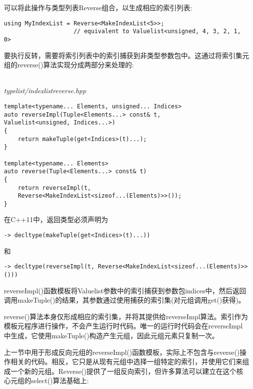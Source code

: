 可以将此操作与类型列表Reverse组合，以生成相应的索引列表:

\begin{lstlisting}[style=styleCXX]
using MyIndexList = Reverse<MakeIndexList<5>>;
					// equivalent to Valuelist<unsigned, 4, 3, 2, 1, 0>
\end{lstlisting}

要执行反转，需要将索引列表中的索引捕获到非类型参数包中。这通过将索引集元组的reverse()算法实现分成两部分来处理的:

\hspace*{\fill} \\ %
\noindent
\textit{typelist/indexlistreverse.hpp}
\begin{lstlisting}[style=styleCXX]
template<typename... Elements, unsigned... Indices>
auto reverseImpl(Tuple<Elements...> const& t,
Valuelist<unsigned, Indices...>)
{
	return makeTuple(get<Indices>(t)...);
}

template<typename... Elements>
auto reverse(Tuple<Elements...> const& t)
{
	return reverseImpl(t,
	Reverse<MakeIndexList<sizeof...(Elements)>>());
}
\end{lstlisting}

在C++11中，返回类型必须声明为

\begin{lstlisting}[style=styleCXX]
-> decltype(makeTuple(get<Indices>(t)...))
\end{lstlisting}

和

\begin{lstlisting}[style=styleCXX]
-> decltype(reverseImpl(t, Reverse<MakeIndexList<sizeof...(Elements)>>()))
\end{lstlisting}

reverseImpl()函数模板将Valuelist参数中的索引捕获到参数包indices中，然后返回调用makeTuple()的结果，其参数通过使用捕获的索引集(对元组调用get()获得)。

reverse()算法本身仅形成相应的索引集，并将其提供给reverseImpl算法。索引作为模板元程序进行操作，不会产生运行时代码。唯一的运行时代码会在reverseImpl中生成，它使用makeTuple()构造产生元组，因此元组元素只复制一次。


上一节中用于形成反向元组的reverseImpl()函数模板，实际上不包含与reverse()操作相关的代码。相反，它只是从现有元组中选择一组特定的索引，并使用它们来组成一个新的元组。Reverse()提供了一组反向索引，但许多算法可以建立在这个核心元组的select()算法基础上:

